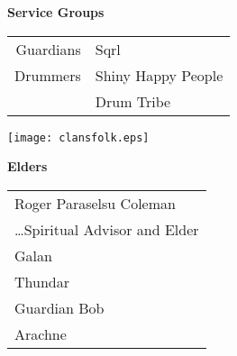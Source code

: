 \documentclass[9pt,twoside,openright,final,article]{memoir}
\def\teg{{\hminfamily TEG\ }}
\renewcommand{\subsection}[1]{%
  \vspace{6pt}%
  \needspace{1.25in}%
  \begin{center}\textbf{\Large \beltanefamily #1}\end{center}

  \nopagebreak}
\begin{document}
\begin{multicols}{2}
  \subsection{Service Groups}
  \begin{center}
    \begin{tabular}{rl}
      Guardians & Sqrl \\
      Drummers  & Shiny Happy People\\
                & Drum Tribe \\
    \end{tabular}
  \end{center}

  \begin{center}
    \texttt{[image: clansfolk.eps]}
  \end{center}

  \subsection{\teg Elders}
  \begin{center}
    \begin{tabular}{l}
      Roger Paraselsu Coleman \\
      { \hspace{1in} \ldots \small Spiritual Advisor and Elder } \\
      Galan \\
      Thundar \\
      Guardian Bob \\
      Arachne \\
    \end{tabular}
  \end{center}

\end{multicols}
\end{document}
